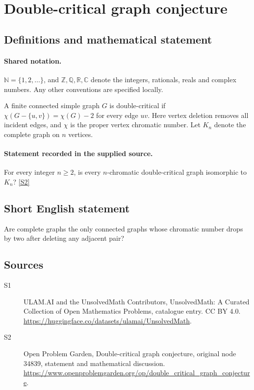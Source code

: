 \documentclass[11pt]{article}
\newcommand{\sref}[2]{\hyperlink{source:#1:#2}{[S#2]}}
\begin{document}
\section{Double-critical graph conjecture}\label{statement}

\subsection{Definitions and mathematical statement}

\paragraph{Shared notation.}$\mathbb N=\{1,2,\ldots\}$, and $\mathbb Z,\mathbb Q,\mathbb R,\mathbb C$ denote the integers, rationals, reals and complex numbers. Any other conventions are specified locally.


A finite connected simple graph $G$ is double-critical if $\chi(G-\{u,v\})=\chi(G)-2$ for every edge $uv$. Here vertex deletion removes all incident edges, and $\chi$ is the proper vertex chromatic number. Let $K_n$ denote the complete graph on $n$ vertices.
\paragraph{Statement recorded in the supplied source.}
For every integer $n\ge2$, is every $n$-chromatic double-critical graph isomorphic to $K_n$? \sref{statement}{2}
\subsection{Short English statement}
Are complete graphs the only connected graphs whose chromatic number drops by two after deleting any adjacent pair?
\subsection{Sources}
\begin{description}
\item[\hypertarget{source:statement:1}{S1}] ULAM.AI and the UnsolvedMath Contributors, UnsolvedMath: A Curated Collection of Open Mathematics Problems, catalogue entry. CC BY 4.0. \url{https://huggingface.co/datasets/ulamai/UnsolvedMath}.
\item[\hypertarget{source:statement:2}{S2}] Open Problem Garden, Double-critical graph conjecture, original node 34839, statement and mathematical discussion. \url{https://www.openproblemgarden.org/op/double_critical_graph_conjecture}.
\end{description}
\label{end:statement}
\end{document}

